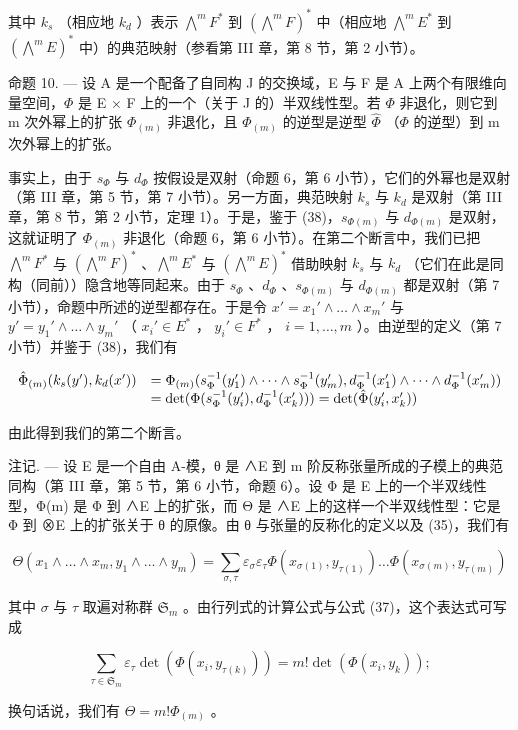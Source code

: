 其中 \(k_s\) （相应地 \(k_d\) ）表示 \(\bigwedge^m F^*\) 到 \((\bigwedge^m F)^*\) 中（相应地 \(\bigwedge^m E^*\) 到 \((\bigwedge^m E)^*\) 中）的典范映射（参看第 III 章，第 8 节，第 2 小节）。

命题 10. --- 设 A 是一个配备了自同构 J 的交换域，E 与 F 是 A 上两个有限维向量空间，\(\Phi\) 是 E \(\times\) F 上的一个（关于 J 的）半双线性型。若 \(\Phi\) 非退化，则它到 m 次外幂上的扩张 \(\Phi_{(m)}\) 非退化，且 \(\Phi_{(m)}\) 的逆型是逆型 \(\hat{\Phi}\) （\(\Phi\) 的逆型）到 m 次外幂上的扩张。

事实上，由于 \(s_{\Phi}\) 与 \(d_{\Phi}\) 按假设是双射（命题 6，第 6 小节），它们的外幂也是双射（第 III 章，第 5 节，第 7 小节）。另一方面，典范映射 \(k_s\) 与 \(k_d\) 是双射（第 III 章，第 8 节，第 2 小节，定理 1）。于是，鉴于 (38)，\(s_{\Phi(m)}\) 与 \(d_{\Phi(m)}\) 是双射，这就证明了 \(\Phi_{(m)}\) 非退化（命题 6，第 6 小节）。在第二个断言中，我们已把 \(\bigwedge^m F^*\) 与 \((\bigwedge^m F)^*\) 、\(\bigwedge^m E^*\) 与 \((\bigwedge^m E)^*\) 借助映射 \(k_s\) 与 \(k_d\) （它们在此是同构（同前））隐含地等同起来。由于 \(s_{\Phi}\) 、\(d_{\Phi}\) 、\(s_{\Phi(m)}\) 与 \(d_{\Phi(m)}\) 都是双射（第 7 小节），命题中所述的逆型都存在。于是令 \(x' = x_1' \wedge \ldots \wedge x_m'\) 与 \(y' = y_1' \wedge \ldots \wedge y_m'\) （ \(x_i' \in E^*\) ， \(y_i' \in F^*\) ， \(i = 1, \ldots, m\) ）。由逆型的定义（第 7 小节）并鉴于 (38)，我们有

\[
\begin{array}{r l} \hat {\Phi} _ {(m)} (k _ {s} (y ^ {\prime}), k _ {d} (x ^ {\prime})) & = \Phi_ {(m)} (s _ {\Phi} ^ {- 1} (y _ {1} ^ {\prime}) \wedge \dots \wedge s _ {\Phi} ^ {- 1} (y _ {m} ^ {\prime}), d _ {\Phi} ^ {- 1} (x _ {1} ^ {\prime}) \wedge \dots \wedge d _ {\Phi} ^ {- 1} (x _ {m} ^ {\prime})) \\ & = \det (\Phi (s _ {\Phi} ^ {- 1} (y _ {i} ^ {\prime}), d _ {\Phi} ^ {- 1} (x _ {k} ^ {\prime}))) = \det (\hat {\Phi} (y _ {i} ^ {\prime}, x _ {k} ^ {\prime})) \end{array}
\]

由此得到我们的第二个断言。

注记. --- 设 E 是一个自由 A-模，θ 是 ∧E 到 m 阶反称张量所成的子模上的典范同构（第 III 章，第 5 节，第 6 小节，命题 6）。设 Φ 是 E 上的一个半双线性型，Φ(m) 是 Φ 到 ∧E 上的扩张，而 Θ 是 ∧E 上的这样一个半双线性型：它是 Φ 到 ⊗E 上的扩张关于 θ 的原像。由 θ 与张量的反称化的定义以及 (35)，我们有

\[
\Theta (x _ {1} \wedge \dots \wedge x _ {m}, y _ {1} \wedge \dots \wedge y _ {m}) = \sum_ {\sigma , \tau} \varepsilon_ {\sigma} \varepsilon_ {\tau} \Phi (x _ {\sigma (1)}, y _ {\tau (1)}) \dots \Phi (x _ {\sigma (m)}, y _ {\tau (m)})
\]

其中 \(\sigma\) 与 \(\tau\) 取遍对称群 \(\mathfrak{S}_{m}\) 。由行列式的计算公式与公式 (37)，这个表达式可写成

\[
\sum_ {\tau \in \mathfrak {S} _ {m}} \varepsilon_ {\tau} \det (\Phi (x _ {i}, y _ {\tau (k)})) = m! \det (\Phi (x _ {i}, y _ {k}));
\]

换句话说，我们有 \(\Theta = m!\Phi_{(m)}\) 。

